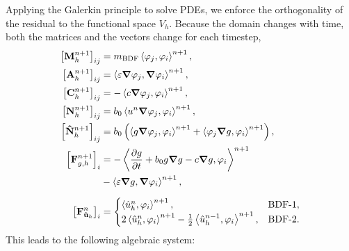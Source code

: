 \documentclass[../../thesis.tex]{subfiles}
\newcommand{\inner}[2]{\left<#1, #2\right>}
\begin{document}
Applying the Galerkin principle to solve PDEs, 
we enforce the orthogonality of the residual to the functional space $V_h$. 
Because the domain changes with time, 
both the matrices and the vectors change for each timestep,
\begin{subequations}
    \label{eq:1d_fom_linear_system_operators}
    \begin{align}
        \left[\vb{M}_{h}^{n+1}\right]_{ij}           
        &= m_{\text{BDF}} \inner{\varphi_j}{\varphi_i}^{n+1}, 
        \\
        \left[\vb{A}_{h}^{n+1}\right]_{ij}           
        &= \inner{\varepsilon \grad \varphi_j}{\grad \varphi_i}^{n+1}, 
        \\
        \left[\vb{C}_{h}^{n+1}\right]_{ij}           
        &= -\inner{c \grad \varphi_j}{\varphi_i}^{n+1}, 
        \\
        \left[\vb{N}_{h}^{n+1}\right]_{ij}           
        &= b_0 \inner{u^{n} \grad \varphi_j}{\varphi_i}^{n+1}, 
        \\
        \left[\vb{\hat{N}}_{h}^{n+1}\right]_{ij}     
        &= b_0 \left(
            \inner{g \grad \varphi_j}{\varphi_i}^{n+1} + 
            \inner{\varphi_j \grad g}{\varphi_i}^{n+1}
            \right), 
        \\
        \left[\vb{F}_{{g,h}}^{n+1}\right]_{i}        
        &= -\inner{\pdv{g}{t} + b_0 g \grad g - c \grad g}{\varphi_i}^{n+1} \nonumber
        \\
        &  -\inner{\varepsilon \grad g}{\grad \varphi_i}^{n+1},
        \label{eq:1d_fom_linear_system_operators_fg}
        \\[2mm]
        \left[\vb{F}_{\vb{\hat{u}}_h}^{n}\right]_{i} &= 
            \begin{cases}
                \inner{\hat{u}_h^{n}}{\varphi_i}^{n+1},                &\text{BDF-1},
                \\
                2\inner{\hat{u}_h^{n}}{\varphi_i}^{n+1}
                - \frac{1}{2}\inner{\hat{u}_h^{n-1}}{\varphi_i}^{n+1}, &\text{BDF-2}.
            \end{cases}
    \end{align}
\end{subequations}
This leads to the following algebraic system:
\end{document}
